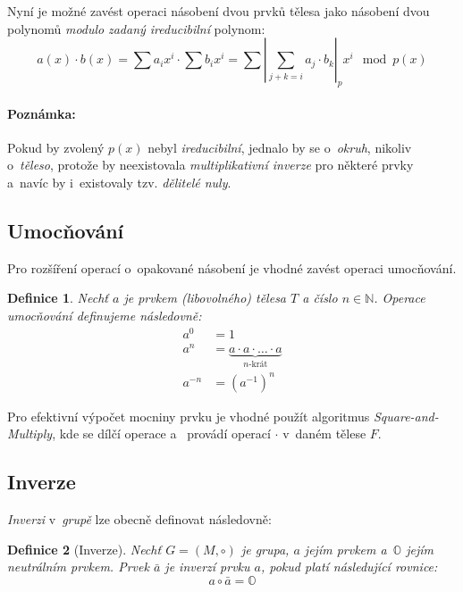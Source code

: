 \documentclass[thesis=M,czech,hidelinks]{FITthesis}[2012/06/26]
\newcommand{\0}{{\textcolor[gray]{0.75}{0}}}
\newtheorem{definice}{Definice}
\begin{document}
Nyní je možné zavést operaci násobení dvou prvků tělesa jako násobení dvou
polynomů \emph{modulo} \emph{zadaný ireducibilní} polynom:
$$
    a(x) \cdot b(x) = \sum a_i x^i \cdot \sum b_i x^i =
    \sum \left|\sum_{j+k=i} a_j \cdot b_k\right|_p x^i \mod p(x)
$$


\paragraph{Poznámka:} Pokud by zvolený $p(x)$ nebyl \emph{ireducibilní}, jednalo
by se o~\emph{okruh}, nikoliv o~\emph{těleso}, protože by neexistovala
\emph{multiplikativní inverze} pro některé prvky a~navíc by i~existovaly tzv.
\emph{dělitelé nuly}.


\subsection{Umocňování}

Pro rozšíření operací o~opakované násobení je vhodné zavést operaci umocňování.

\begin{definice}
    Nechť $a$ je prvkem (libovolného) tělesa $T$ a číslo $n\in\mathbb{N}$. Operace
    umocňování definujeme následovně:
    \begin{align*}
        a^0     &= 1 \\
        a^n     &= \underbrace{a \cdot a \cdot \ldots \cdot a}_{\text{$n$-krát}} \\
        a^{-n}  &= \left(a^{-1}\right)^n
    \end{align*}
\end{definice}

Pro efektivní výpočet mocniny prvku je vhodné použít algoritmus
\emph{Square-and-Multiply}, kde se dílčí operace  a~
provádí operací $\cdot$ v~daném tělese $F$.


\subsection{Inverze}

\emph{Inverzi} v~\emph{grupě} lze obecně definovat následovně:

\begin{definice}[Inverze]
    Nechť $G = (M,\circ)$ je \emph{grupa}, $a$ jejím prvkem a~$\mathbb{O}$ jejím
    neutrálním prvkem. Prvek $\bar{a}$ je \emph{inverzí} prvku $a$, pokud platí
    následující rovnice:
    $$ a \circ \bar{a} = \mathbb{O} $$
\end{definice}
\end{document}
